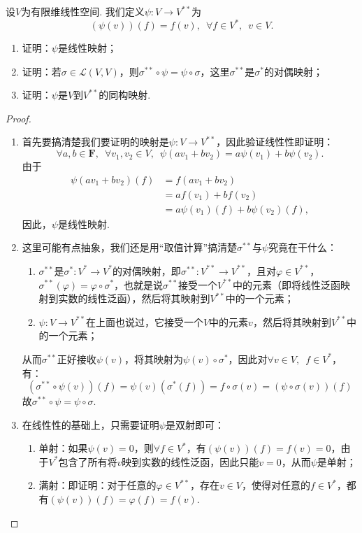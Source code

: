 \begin{example}{}{}
    设$V$为有限维线性空间. 我们定义$\psi:V\to V^{**}$为
    \[(\psi(v))(f) = f(v),\enspace\forall f\in V^*,\enspace v\in V.\]
    \begin{enumerate}
        \item 证明：$\psi$是线性映射；

        \item 证明：若$\sigma\in\mathcal{L}(V,V)$，则$\sigma^{**}\circ\psi=\psi\circ\sigma$，这里$\sigma^{**}$是$\sigma^*$的对偶映射；

        \item 证明：$\psi$是$V$到$V^{**}$的同构映射.
    \end{enumerate}
\end{example}

\begin{proof}
    \begin{enumerate}
        \item 首先要搞清楚我们要证明的映射是$\psi: V \to V^{**}$，因此验证线性性即证明：\[\forall a,b \in \mathbf{F}, \enspace \forall v_1,v_2 \in V, \enspace \psi(av_1 + bv_2) = a\psi(v_1) + b\psi(v_2).\]
        由于
        \begin{align*}
            \psi(av_1 + bv_2)(f) &= f(av_1 + bv_2) \\
            &= af(v_1) + bf(v_2) \\
            &= a\psi(v_1)(f) + b\psi(v_2)(f),
        \end{align*}
        因此，$\psi$是线性映射.
        \item 这里可能有点抽象，我们还是用``取值计算''搞清楚$\sigma^{**}$与$\psi$究竟在干什么：
        \begin{enumerate}
            \item $\sigma^{**}$是$\sigma^*\colon V^* \to V^*$的对偶映射，即$\sigma^{**}\colon V^{**} \to V^{**}$，且对$\varphi\in V^{**}$，$\sigma^{**}(\varphi)=\varphi\circ\sigma^*$，也就是说$\sigma^{**}$接受一个$V^{**}$中的元素（即将线性泛函映射到实数的线性泛函），然后将其映射到$V^{**}$中的一个元素；
            \item $\psi\colon V \to V^{**}$在上面也说过，它接受一个$V$中的元素$v$，然后将其映射到$V^{**}$中的一个元素；
        \end{enumerate}
        从而$\sigma^{**}$正好接收$\psi(v)$，将其映射为$\psi(v)\circ\sigma^*$，因此对$\forall v \in V, \enspace f \in V^*$，有：
        \[(\sigma^{**}\circ\psi(v))(f) = \psi(v)(\sigma^*(f)) = f\circ\sigma(v) = (\psi\circ\sigma(v))(f)\]
        故$\sigma^{**}\circ\psi=\psi\circ\sigma$.
        \item 在线性性的基础上，只需要证明$\psi$是双射即可：
        \begin{enumerate}
            \item 单射：如果$\psi(v)=0$，则$\forall f\in V^*$，有$(\psi(v))(f)=f(v)=0$，由于$V^*$包含了所有将$v$映到实数的线性泛函，因此只能$v=0$，从而$\psi$是单射；
            \item 满射：即证明：对于任意的$\varphi \in V^{**}$，存在$v \in V$，使得对任意的$f \in V^*$，都有$(\psi(v))(f)=\varphi(f)=f(v)$.


\end{enumerate}
\end{enumerate}
\end{proof}
